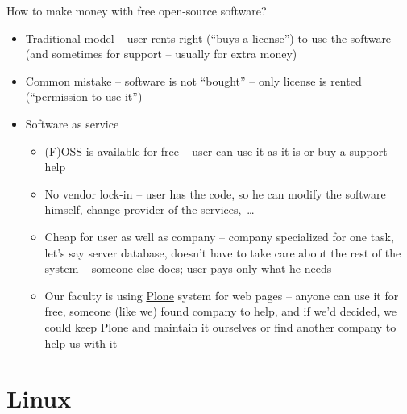 \documentclass[compress, ucs, xelatex, 11pt, xcolor=svgnames,
  hyperref={
    bookmarks=true,
    unicode=true,
    colorlinks=true,
    pdftitle={Linux, command line and MetaCentrum},
    plainpages=false,
    pdfauthor={Vojtech Zeisek},
    pdfsubject={Course about use of Linux command line, writing shell scripts and using MetaCentrum of CESNET},
    pdfcreator={XeLaTeX},
    pdfkeywords={Linux, GNU, BASH, shell, command line, MetaCentrum},
    linkcolor=DarkRed,
    anchorcolor=DarkBlue,
    citecolor=Indigo,
    filecolor=NavyBlue,
    menucolor=DarkMagenta,
    urlcolor=DarkBlue,
    pdftex},
  url={hyphens, lowtilde} %
  ]{beamer}
\begin{document}
\begin{frame}{How to make money with free open-source software?}
  \begin{itemize}
    \item Traditional model -- user rents right (``buys a license'') to use the software (and sometimes for support -- usually for extra money)
    \item Common mistake -- software is not ``bought'' -- only license is rented (``permission to use it'')
    \item Software as service
    \begin{itemize}
      \item (F)OSS is available for free -- user can use it as it is or buy a support -- help
      \item No vendor lock-in -- user has the code, so he can modify the software himself, change provider of the services,~\ldots
      \item Cheap for user as well as company -- company specialized for one task, let's say server database, doesn't have to take care about the rest of the system -- someone else does; user pays only what he needs
      \item Our faculty is using \href{https://plone.org/}{Plone} system for web pages -- anyone can use it for free, someone (like we) found company to help, and if we'd decided, we  could keep Plone and maintain it ourselves or find another company to help us with it
    \end{itemize}
  \end{itemize}
\end{frame}

\section{Linux}
\end{document}
